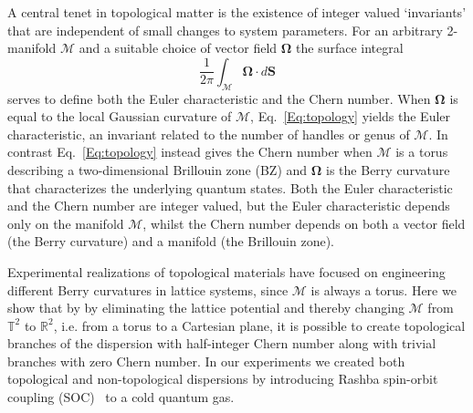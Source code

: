 A central tenet in topological matter is the existence of integer valued `invariants' that are independent of small changes to system parameters. For an arbitrary 2-manifold $\mathcal{M}$ and a suitable choice of vector field $\mathbf{\Omega}$ the surface integral
%
\begin{equation}
	\frac{1}{2\pi}\int_{\mathcal{M}}\mathbf \Omega\cdot d\mathbf S
	\label{Eq:topology}
\end{equation}
%
serves to define both the Euler characteristic and the Chern number. When $\mathbf{\Omega}$ is equal to the local Gaussian curvature of $\mathcal{M}$, Eq.~\ref{Eq:topology} yields the Euler characteristic, an invariant related to the number of handles or genus of $\mathcal{M}$. In contrast Eq.~\ref{Eq:topology} instead gives the Chern number when $\mathcal{M}$ is a torus describing a two-dimensional Brillouin zone (BZ) and $\mathbf{\Omega}$ is the Berry curvature that characterizes the underlying quantum states. Both the Euler characteristic and the Chern number are integer valued, but the Euler characteristic depends only on the manifold $\mathcal{M}$, whilst the Chern number depends on both a vector field (the Berry curvature) and a manifold (the Brillouin zone). 

Experimental realizations of topological materials have focused on engineering different Berry curvatures in lattice systems, since $\mathcal{M}$ is always a torus. Here we show that by by eliminating the lattice potential and thereby changing  $\mathcal{M}$ from ${\mathbb T}^2$ to ${\mathbb R}^2$, i.e. from a torus to a Cartesian plane, it is possible to create topological branches of the dispersion with half-integer Chern number along with trivial branches with zero Chern number. In our experiments we created both topological and non-topological dispersions by introducing Rashba spin-orbit coupling (SOC)~\cite{campbell_realistic_2011} to a cold quantum gas.

